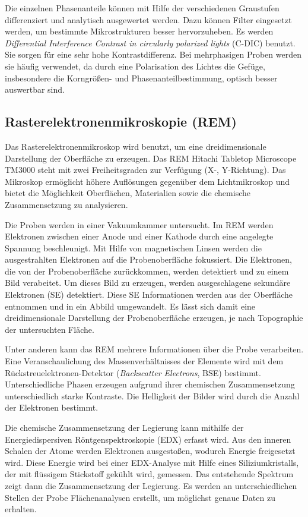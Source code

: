 Die einzelnen Phasenanteile können mit Hilfe der verschiedenen Graustufen differenziert und analytisch ausgewertet werden. Dazu können Filter eingesetzt werden, um bestimmte Mikrostrukturen besser hervorzuheben. Es werden \textit{Differential Interference Contrast in circularly polarized lights} (C-DIC) benutzt. Sie sorgen für eine sehr hohe Kontrastdifferenz. Bei mehrphasigen Proben werden sie häufig verwendet, da durch eine Polarisation des Lichtes die Gefüge, insbesondere die Korngrößen- und Phasenanteilbestimmung, optisch besser auswertbar sind.

\subsection*{Rasterelektronenmikroskopie (REM)}

Das Rasterelektronenmikroskop wird benutzt, um eine dreidimensionale Darstellung der Oberfläche zu erzeugen. Das REM Hitachi Tabletop Microscope TM3000 steht mit zwei Freiheitsgraden zur Verfügung (X-, Y-Richtung). Das Mikroskop ermöglicht höhere Auflösungen gegenüber dem Lichtmikroskop und bietet die Möglichkeit Oberflächen, Materialien sowie die chemische Zusammensetzung zu analysieren. 

Die Proben werden in einer Vakuumkammer untersucht. Im REM werden Elektronen zwischen einer Anode und einer Kathode durch eine angelegte Spannung beschleunigt. Mit Hilfe von magnetischen Linsen werden die ausgestrahlten Elektronen auf die Probenoberfläche fokussiert. 
Die Elektronen, die von der Probenoberfläche zurückkommen, werden detektiert und zu einem Bild verabeitet. 
Um dieses Bild zu erzeugen, werden ausgeschlagene sekundäre Elektronen (SE) detektiert. Diese SE Informationen werden aus der Oberfläche entnommen und in ein Abbild umgewandelt. 
Es lässt sich damit eine dreidimensionale Darstellung der Probenoberfläche erzeugen, je nach Topographie der untersuchten Fläche.

Unter anderen kann das REM mehrere Informationen über die Probe verarbeiten. Eine Veranschaulichung des Massenverhältnisses der Elemente wird mit dem Rückstreuelektronen-Detektor (\textit{Backscatter Electrons}, BSE) bestimmt. Unterschiedliche Phasen erzeugen aufgrund ihrer chemischen Zusammensetzung unterschiedlich starke Kontraste. Die Helligkeit der Bilder wird durch die Anzahl der Elektronen bestimmt.

Die chemische Zusammensetzung der Legierung kann mithilfe der Energiedispersiven Röntgenspektroskopie (EDX) erfasst wird. Aus den inneren Schalen der Atome werden Elektronen ausgestoßen, wodurch Energie freigesetzt wird. Diese Energie wird bei einer EDX-Analyse mit Hilfe eines Siliziumkristalls, der mit flüssigem Stickstoff gekühlt wird, gemessen. Das entstehende Spektrum zeigt dann die Zusammensetzung der Legierung. Es werden an unterschiedlichen Stellen der Probe Flächenanalysen erstellt, um möglichst genaue Daten zu erhalten.

